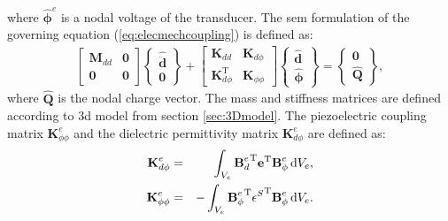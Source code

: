 where \(\widehat{\boldsymbol{\phi}}^e\) is a nodal voltage of the transducer. The \ac{sem} formulation of the governing equation (\ref{eq:elecmechcoupling}) is defined as:
\begin{eqnarray}
	\left [\begin{array}{cc}
		\textbf{M}_{dd} & \textbf{0}\\
		\textbf{0} & \textbf{0}
	\end{array}\right]
	\left \{\begin{array}{c}
		\widehat{\ddot{\textbf{d}}} \\
		\textbf{0}
	\end{array}\right \} +
	\left [\begin{array}{cc}
		\textbf{K}_{dd} & \textbf{K}_{d \phi}\\
		\textbf{K}_{d \phi}^{\mathrm{T}} & \textbf{K}_{\phi \phi}
	\end{array}\right]
	\left \{\begin{array}{c}
		\widehat{\textbf{d}} \\
		\widehat{\boldsymbol{\phi}}
	\end{array}\right \}  = 
	\left \{\begin{array}{c}
		\textbf{0}\\
		\widehat{\textbf{Q}}
	\end{array}\right \},
	\label{eq:pzt_sem}
\end{eqnarray}
%
where \(\widehat{\textbf{Q}}\) is the nodal charge vector.
The mass and stiffness matrices are defined according to \ac{3d} model from section \ref{sec:3Dmodel}.
The piezoelectric coupling matrix \(\textbf{K}_{\phi \phi}^e\) and the dielectric permittivity matrix \(\textbf{K}_{d \phi}^e\) are defined as:
\begin{eqnarray}
	\textbf{K}_{d\phi}^e & = & \int_{V_e}{\textbf{B}_d^e}^{\mathrm{T}}\textbf{e}^{\mathrm{T}} \textbf{B}_{\phi}^e \mathop{}\!\mathrm{d} V_e,\\
	\textbf{K}_{\phi \phi}^e & = & -\int_{V_e}{\textbf{B}_{\phi}^e}^{\mathrm{T}} 
	{\textbf{\(\epsilon\)}^S}^{\mathrm{T}} \textbf{B}_{\phi}^e \mathop{}\!\mathrm{d} V_e.
\end{eqnarray}

